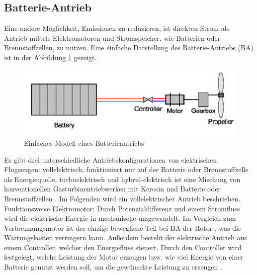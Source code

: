 \subsection{Batterie-Antrieb}
Eine andere Möglichkeit, Emissionen zu reduzieren, ist direkten Strom als Antrieb mittels Elektromotoren und Stromspeicher, wie Batterien oder Brennstoffzellen, zu nutzen.
Eine einfache Darstellung des Batterie-Antriebs (BA) ist in der Abbildung \ref{ba} gezeigt.
%
\begin{figure}[h]
	\centering
	\includegraphics[width=0.7\linewidth]{Bilder/BA.png}
	\caption[Einfaches Modell eines Batterieantriebs]{Einfaches Modell eines Batterieantriebs \cite{hepperle2012electric}}
	\label{ba}
\end{figure}


Es gibt drei unterschiedliche Antriebskonfigurationen von elektrischen Flugzeugen: vollelektrisch, funktioniert nur auf der Batterie oder
Brennstoffzelle als Energiequelle, turboelektrisch und hybrid-elektrisch ist eine Mischung von konventionellen 
Gasturbinentriebwerken mit Kerosin und Batterie oder Brennstoffzellen \cite{dahal2021techno}. %
Im Folgenden wird ein vollelektrischer Antrieb beschrieben.
%
Funktionsweise Elektromotor: Durch Potenzialdifferenz und einem Stromfluss wird die elektrische Energie in mechanische umgewandelt.
Im Vergleich zum Verbrennungsmotor ist der einzige bewegliche Teil bei BA der Rotor \cite{donckers2024electric}, 
was die Wartungskosten verringern kann. Außerdem besteht der elektrische Antrieb aus einem Controller, welcher den Energiefluss steuert. 
Durch den Controller wird festgelegt, welche Leistung der Motor erzeugen bzw. wie viel Energie von 
einer Batterie genutzt werden soll, um die gewünschte Leistung zu erzeugen \cite{donckers2024electric}. 

